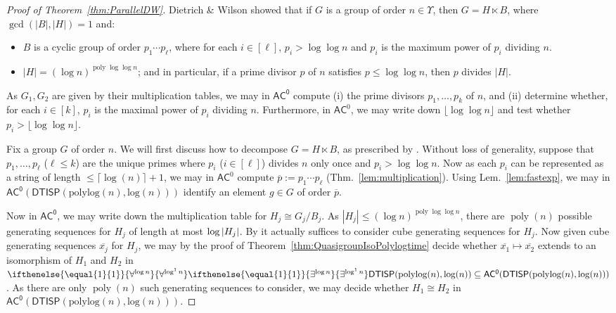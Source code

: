 \documentclass{theoretics}
\newcommand{\betacc}[1]{\ifthenelse{\equal{#1}{1}}{\exists^{\log n}}{\exists^{\log^{#1}n}}} %
\newcommand{\alphacc}[1]{\ifthenelse{\equal{#1}{1}}{\forall^{\log n}}{\forall^{\log^{#1}n}}} %
\newcommand{\abs}[1]{\left|\mathinner{#1}\right|}
\newcommand{\Lem}[1]{Lem.~\ref{#1}\xspace}
\newcommand{\Thm}[1]{Thm.~\ref{#1}\xspace}
\DeclareMathOperator{\poly}{poly}
\newcommand*{\ComplexityClass}[1]{\ensuremath{\mathsf{#1}}\xspace}
\newcommand{\DTISP}{\ComplexityClass{DTISP}}
\newcommand{\DTISPpll}{\ensuremath{\DTISP(\mathrm{polylog}(n),\mathrm{log}(n))}\xspace}
\newcommand{\AC}{\ComplexityClass{AC}}
\newcommand{\ACz}{\ComplexityClass{AC^0}}
\begin{document}
\begin{proof}[Proof of Theorem~\ref{thm:ParallelDW}]
Dietrich \& Wilson showed \cite[Theorem~2.5]{DietrichWilson} that if $G$ is a group of order $n \in \Upsilon$, then $G = H \ltimes B$, where $\gcd(|B|,|H|)=1$ and:
\begin{itemize}
    \item $B$ is a cyclic group of order $p_{1} \cdots p_{\ell}$, where for each $i \in [\ell]$, $p_{i} > \log \log n$ and $p_{i}$ is the maximum power of $p_{i}$ dividing $n$.
    \item $|H| = (\log n)^{\poly \log \log n}$; and in particular, if a prime divisor $p$ of $n$ satisfies $p \leq \log \log n$, then $p$ divides $|H|$. 
\end{itemize} 

As $G_{1}, G_{2}$ are given by their multiplication tables, we may in $\ACz$ compute (i) the prime divisors $p_{1}, \ldots, p_{k}$ of $n$, and (ii) determine whether, for each $i \in[k]$, $p_{i}$ is the maximal power of $p_{i}$ dividing $n$. Furthermore, in $\AC^{0}$, we may write down $\lfloor \log \log n \rfloor$ and test whether $p_{i} > \lfloor \log \log n \rfloor$.

Fix a group $G$ of order $n$. We will first discuss how to decompose $G = H \ltimes B$, as prescribed by \cite[Theorem~2.5]{DietrichWilson}.
Without loss of generality, suppose that $p_{1}, \ldots, p_{\ell}$ ($\ell \leq k$) are the unique primes where $p_{i}$ ($i \in [\ell]$) divides $n$ only once and $p_{i} > \log \log n$. Now as each $p_{i}$ can be represented as a string of length $\leq \lceil \log(n)\rceil+1$, we may in $\AC^{0}$ compute $\overline{p} := p_{1} \cdots p_{\ell}$ (\Thm{lem:multiplication}). Using \Lem{lem:fastexp}, we may in $\ACz(\DTISPpll)$ identify an element $g \in G$ of order $\overline{p}$. 


Now in $\ACz$, we may write down the multiplication table for $H_{j} \cong G_{j}/B_{j}$.
As $|H_{j}| \leq (\log n)^{\poly \log \log n}$, there are $\poly(n)$ possible generating sequences for $H_{j}$ of length at most $\log\abs{H_j}$.
By \cite{BabaiSzemeredi} it actually suffices to consider cube generating sequences for $H_{j}$.
Now given cube generating sequences $\overline{x_{j}}$ for $H_{j}$, we may by the proof of Theorem~\ref{thm:QuasigroupIsoPolylogtime} decide whether $\overline{x_{1}} \mapsto \overline{x_{2}}$ extends to an isomorphism of $H_{1}$ and $H_{2}$ in $\alphacc{1}\betacc{1}\DTISPpll \subseteq \ACz(\DTISPpll)$.
As there are only $\poly(n)$ such generating sequences to consider, we may decide whether $H_{1} \cong H_{2}$ in $\ACz(\DTISPpll)$.


\end{proof}
\end{document}
